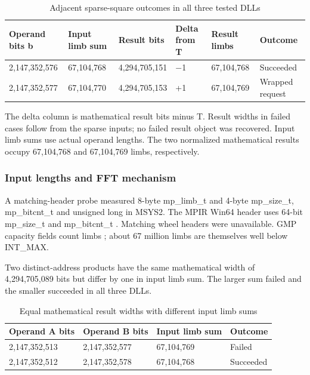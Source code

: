 \documentclass[11pt,a4paper]{article}
\begin{document}
\begin{table}[htbp]
\centering\small
\caption{Adjacent sparse-square outcomes in all three tested DLLs}
\begin{tabularx}{\linewidth}{lXXXXX}
\toprule
Operand bits b & Input limb sum & Result bits & Delta from T & Result limbs & Outcome \\
\midrule
2,147,352,576 & 67,104,768 & 4,294,705,151 & \ensuremath{-}1 & 67,104,768 & Succeeded \\
2,147,352,577 & 67,104,770 & 4,294,705,153 & +1 & 67,104,769 & Wrapped request \\
\bottomrule
\end{tabularx}
\end{table}

The delta column is mathematical result bits minus T. Result widths in failed cases follow from the sparse inputs; no failed result object was recovered. Input limb sums use actual operand lengths. The two normalized mathematical results occupy 67,104,768 and 67,104,769 limbs, respectively.

\subsubsection{Input lengths and FFT mechanism}

A matching-header probe measured 8-byte mp\_\allowbreak{}limb\_\allowbreak{}t and 4-byte mp\_\allowbreak{}size\_\allowbreak{}t, mp\_\allowbreak{}bitcnt\_\allowbreak{}t and unsigned long in MSYS2. The MPIR Win64 header uses 64-bit mp\_\allowbreak{}size\_\allowbreak{}t and mp\_\allowbreak{}bitcnt\_\allowbreak{}t \cite{mpir}. Matching wheel headers were unavailable. GMP capacity fields count limbs \cite{gmp_internals}; about 67 million limbs are themselves well below INT\_\allowbreak{}MAX.

Two distinct-address products have the same mathematical width of 4,294,705,089 bits but differ by one in input limb sum. The larger sum failed and the smaller succeeded in all three DLLs.

\begin{table}[htbp]
\centering\small
\caption{Equal mathematical result widths with different input limb sums}
\begin{tabularx}{\linewidth}{lXXX}
\toprule
Operand A bits & Operand B bits & Input limb sum & Outcome \\
\midrule
2,147,352,513 & 2,147,352,577 & 67,104,769 & Failed \\
2,147,352,512 & 2,147,352,578 & 67,104,768 & Succeeded \\
\bottomrule
\end{tabularx}
\end{table}
\end{document}
